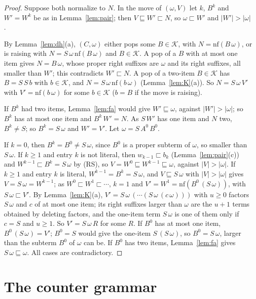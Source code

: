 \documentclass[11pt]{amsart}
\theoremstyle{definition}
\newcommand{\sz}[1]{\lvert#1\rvert}
\newcommand{\nf}{\mathrm{nf}}
\newcommand{\Kc}{\mathcal K}
\newcommand{\sqs}{\sqsubseteq}
\newcommand{\psq}{\sqsubset}
\begin{document}
\begin{proof}
Suppose both normalize to $N$. In the move of $(\omega,V)$ let $k$, $B^k$ and $W'=W^k$ be as in
Lemma~\ref{lem:pair}; then $V\sqs W'\psq N$, so $\omega\psq W'$ and $\sz{W'}>\sz\omega$.

By Lemma~\ref{lem:dh}(a), $(C,\omega)$ either pops some $B\in\Kc$, with $N=\nf(B\,\omega)$, or is
raising with $N=S\,\omega\,\nf(B\,\omega)$ and $B\in\Kc$. A pop of a $B$ with at most one item gives
$N=B\,\omega$, whose proper right suffixes are $\omega$ and its right suffixes, all smaller than
$W'$; this contradicts $W'\psq N$. A pop of a two-item $B\in\Kc$ has $B=S\,S\,b$ with $b\in\Kc$, and
$N=S\,\omega\,\nf(b\,\omega)$ (Lemma~\ref{lem:K}(a)). So $N=S\,\omega\,V'$ with $V'=\nf(b\,\omega)$ for
some $b\in\Kc$ ($b=B$ if the move is raising).

If $B^k$ had two items, Lemma~\ref{lem:fa} would give $W'\sqs\omega$, against $\sz{W'}>\sz\omega$; so
$B^k$ has at most one item and $B^k\,W'=N$. As $S\,W'$ has one item and $N$ two, $B^k\ne S$; so
$B^k=S\,\omega$ and $W'=V'$. Let $\omega=S\,A^0\,B^0$.

If $k=0$, then $B^k=B^0\ne S\,\omega$, since $B^0$ is a proper subterm of $\omega$, so smaller than
$S\,\omega$. If $k\ge1$ and entry $k$ is not literal, then
$w_{k-1}\psq b_k$ (Lemma~\ref{lem:pair}(c)) and $W^{k-1}\psq B^k=S\,\omega$ by (RS), so
$V=W^0\sqs W^{k-1}\sqs\omega$, against $\sz V>\sz\omega$. If $k\ge1$ and entry $k$ is literal,
$W^{k-1}=B^k=S\,\omega$, and $V\sqs S\,\omega$ with $\sz V>\sz\omega$ gives $V=S\,\omega=W^{k-1}$;
as $W^0\psq W^1\psq\cdots$, $k=1$ and $V'=W^1=\nf(B^0\,(S\,\omega))$, with $S\,\omega\psq V'$. By
Lemma~\ref{lem:K}(a), $V'=S\,\omega\,(\cdots(S\,\omega\,(c\,\omega)))$ with $u\ge0$ factors
$S\,\omega$ and $c$ of at most one item; its right suffixes larger than $\omega$ are the $u+1$
terms obtained by deleting factors, and the one-item term $S\,\omega$ is one of them only if $c=S$
and $u\ge1$. So $V'=S\,\omega\,R$ for some $R$. If $B^0$ has at most one item, $B^0\,(S\,\omega)=V'$;
$B^0=S$ would give the one-item $S\,(S\,\omega)$, so $B^0=S\,\omega$, larger than the subterm $B^0$
of $\omega$ can be. If $B^0$ has two items,
Lemma~\ref{lem:fa} gives $S\,\omega\sqs\omega$. All cases are contradictory.
\end{proof}

\section{The counter grammar}\label{sec:grammar}
\end{document}
